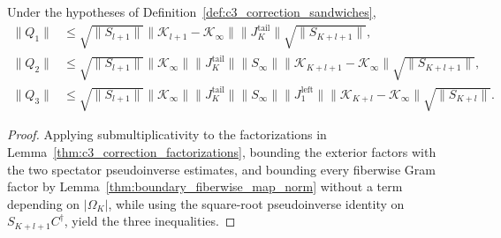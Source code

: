 \begin{lemma}
    \label{thm:c3_correction_bounds}
    \leanok
    Under the hypotheses of
    Definition~\ref{def:c3_correction_sandwiches},
    \begin{align}
        \lVert Q_1\rVert
         & \leq \sqrt{\lVert S_{l+1}\rVert}
        \lVert\mathcal K_{l+1}-\mathcal K_\infty\rVert
        \lVert J_K^{\mathrm{tail}}\rVert
        \sqrt{\lVert S_{K+l+1}\rVert},      \\
        \lVert Q_2\rVert
         & \leq \sqrt{\lVert S_{l+1}\rVert}
        \lVert\mathcal K_\infty\rVert
        \lVert J_K^{\mathrm{tail}}\rVert
        \lVert S_\infty\rVert
        \lVert\mathcal K_{K+l+1}-\mathcal K_\infty\rVert
        \sqrt{\lVert S_{K+l+1}\rVert},      \\
        \lVert Q_3\rVert
         & \leq \sqrt{\lVert S_{l+1}\rVert}
        \lVert\mathcal K_\infty\rVert
        \lVert J_K^{\mathrm{tail}}\rVert
        \lVert S_\infty\rVert
        \lVert J_1^{\mathrm{left}}\rVert
        \lVert\mathcal K_{K+l}-\mathcal K_\infty\rVert
        \sqrt{\lVert S_{K+l}\rVert}.
    \end{align}
\end{lemma}

\begin{proof}
    \leanok
    Applying submultiplicativity to the factorizations in
    Lemma~\ref{thm:c3_correction_factorizations}, bounding the exterior
    factors with the two spectator pseudoinverse estimates, and bounding every
    fiberwise Gram factor by Lemma~\ref{thm:boundary_fiberwise_map_norm}
    without a term depending on $|\Omega_K|$, while using the square-root
    pseudoinverse identity on $S_{K+l+1}C^\dagger$, yield the three inequalities.
\end{proof}

